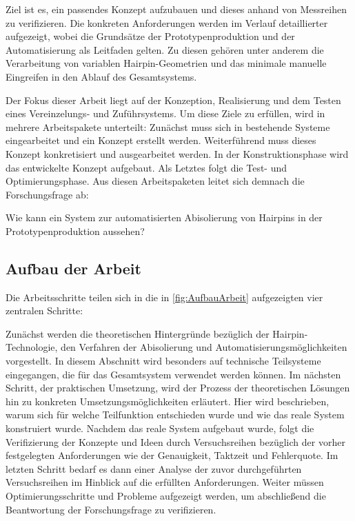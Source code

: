 Ziel ist es, ein passendes Konzept aufzubauen und dieses anhand von Messreihen zu verifizieren.
Die konkreten Anforderungen werden im Verlauf detaillierter aufgezeigt, wobei die Grundsätze der Prototypenproduktion
und der Automatisierung als Leitfaden gelten. Zu diesen gehören unter anderem die Verarbeitung von variablen
Hairpin-Geometrien und das minimale manuelle Eingreifen in den Ablauf des Gesamtsystems.

Der Fokus dieser Arbeit liegt auf der Konzeption, Realisierung und dem Testen
eines Vereinzelungs- und Zuführsystems.
Um diese Ziele zu erfüllen, wird in mehrere Arbeitspakete unterteilt: Zunächst muss sich in
bestehende Systeme eingearbeitet und ein Konzept erstellt werden. Weiterführend muss
dieses Konzept konkretisiert und ausgearbeitet werden. In der Konstruktionsphase wird das
entwickelte Konzept aufgebaut. Als Letztes folgt die Test- und Optimierungsphase. Aus diesen Arbeitspaketen
leitet sich demnach die  Forschungsfrage ab: 

Wie kann ein System zur automatisierten
Abisolierung von Hairpins in der Prototypenproduktion aussehen?
%
%
\subsection{Aufbau der Arbeit}\label{sec:AblaufThesis}
Die Arbeitsschritte teilen sich in die in \cref{fig:AufbauArbeit} aufgezeigten vier zentralen Schritte:

Zunächst werden die theoretischen Hintergründe bezüglich der Hairpin-Technologie, den
Verfahren der Abisolierung und Automatisierungsmöglichkeiten vorgestellt. In diesem Abschnitt wird besonders auf technische Teilsysteme
eingegangen, die für das Gesamtsystem verwendet werden können. Im nächsten Schritt, der praktischen Umsetzung,
wird der Prozess der theoretischen Lösungen hin zu konkreten Umsetzungsmöglichkeiten erläutert. Hier wird beschrieben, warum
sich für welche Teilfunktion entschieden wurde und wie das reale System konstruiert wurde. Nachdem das reale System aufgebaut
wurde, folgt die Verifizierung der Konzepte und Ideen durch Versuchsreihen bezüglich der vorher festgelegten Anforderungen wie
der Genauigkeit, Taktzeit und Fehlerquote. Im letzten Schritt bedarf es dann einer Analyse der zuvor durchgeführten Versuchsreihen
im Hinblick auf die erfüllten Anforderungen. Weiter müssen Optimierungsschritte und Probleme aufgezeigt werden, um abschließend
die Beantwortung der Forschungsfrage zu verifizieren.

\newcommand{\kap}[1]{%
  \colorbox{figAkzent}{\makebox[2.2mm][c]{\textcolor{white}{\bfseries\tiny #1}}}}

